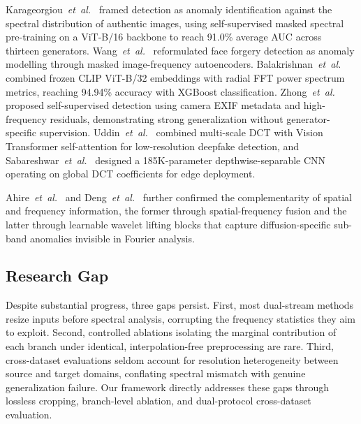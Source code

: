 \documentclass[conference]{IEEEtran}
\begin{document}
Karageorgiou~\emph{et~al.}~\cite{karageorgiou2025spai} framed detection as anomaly identification against the spectral distribution of authentic images, using self-supervised masked spectral pre-training on a ViT-B/16 backbone to reach 91.0\% average AUC across thirteen generators. Wang~\emph{et~al.}~\cite{wang2025mifae} reformulated face forgery detection as anomaly modelling through masked image-frequency autoencoders. Balakrishnan~\emph{et~al.}~\cite{balakrishnan2025spectraclip} combined frozen CLIP ViT-B/32 embeddings with radial FFT power spectrum metrics, reaching 94.94\% accuracy with XGBoost classification. Zhong~\emph{et~al.}~\cite{zhong2026selfsup} proposed self-supervised detection using camera EXIF metadata and high-frequency residuals, demonstrating strong generalization without generator-specific supervision. Uddin~\emph{et~al.}~\cite{uddin2025lowres} combined multi-scale DCT with Vision Transformer self-attention for low-resolution deepfake detection, and Sabareshwar~\emph{et~al.}~\cite{sabareshwar2024lightweight} designed a 185K-parameter depthwise-separable CNN operating on global DCT coefficients for edge deployment.

Ahire~\emph{et~al.}~\cite{ahire2025sffnet} and Deng~\emph{et~al.}~\cite{deng2023wavelet} further confirmed the complementarity of spatial and frequency information, the former through spatial-frequency fusion and the latter through learnable wavelet lifting blocks that capture diffusion-specific sub-band anomalies invisible in Fourier analysis.

\subsection{Research Gap}

Despite substantial progress, three gaps persist. First, most dual-stream methods resize inputs before spectral analysis, corrupting the frequency statistics they aim to exploit. Second, controlled ablations isolating the marginal contribution of each branch under identical, interpolation-free preprocessing are rare. Third, cross-dataset evaluations seldom account for resolution heterogeneity between source and target domains, conflating spectral mismatch with genuine generalization failure. Our framework directly addresses these gaps through lossless cropping, branch-level ablation, and dual-protocol cross-dataset evaluation.
\end{document}
